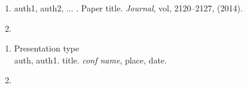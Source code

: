 \documentclass[BTech]{iitmdiss}
\begin{document}



    \begin{singlespace}
        
    \end{singlespace}



    \listofpapers

    \begin{enumerate}
        \item auth1, auth2, ... . Paper title. {\em Journal}, vol,
        2120--2127, (2014).
        \item
    \end{enumerate}

    \begin{enumerate}
        \item Presentation type\\ {auth}, auth1. {title}. {\textit{conf name}}, place, date.
        \item
    \end{enumerate}
\end{document}
